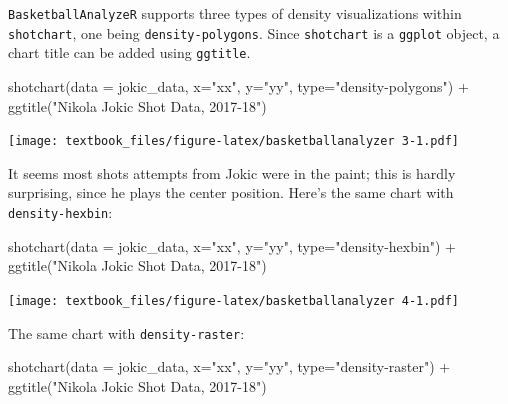 \documentclass[
  11pt,
]{book}
\newenvironment{Shaded}{\begin{snugshade}}{\end{snugshade}}
\newcommand{\AttributeTok}[1]{\textcolor[rgb]{0.77,0.63,0.00}{#1}}
\newcommand{\FunctionTok}[1]{\textcolor[rgb]{0.00,0.00,0.00}{#1}}
\newcommand{\NormalTok}[1]{#1}
\newcommand{\SpecialCharTok}[1]{\textcolor[rgb]{0.00,0.00,0.00}{#1}}
\newcommand{\StringTok}[1]{\textcolor[rgb]{0.31,0.60,0.02}{#1}}
\theoremstyle{definition}
\theoremstyle{definition}
\theoremstyle{definition}
\theoremstyle{definition}
\theoremstyle{remark}
\begin{document}
\texttt{BasketballAnalyzeR} supports three types of density visualizations within \texttt{shotchart}, one being \texttt{density-polygons}. Since \texttt{shotchart} is a \texttt{ggplot} object, a chart title can be added using \texttt{ggtitle}.

\begin{Shaded}
\begin{Highlighting}[]
\FunctionTok{shotchart}\NormalTok{(}\AttributeTok{data =}\NormalTok{ jokic\_data, }\AttributeTok{x=}\StringTok{"xx"}\NormalTok{, }\AttributeTok{y=}\StringTok{"yy"}\NormalTok{, }\AttributeTok{type=}\StringTok{"density{-}polygons"}\NormalTok{) }\SpecialCharTok{+} 
  \FunctionTok{ggtitle}\NormalTok{(}\StringTok{"Nikola Jokic Shot Data, 2017{-}18"}\NormalTok{)}
\end{Highlighting}
\end{Shaded}

\texttt{[image: textbook\_files/figure-latex/basketballanalyzer 3-1.pdf]}

It seems most shots attempts from Jokic were in the paint; this is hardly surprising, since he plays the center position. Here's the same chart with \texttt{density-hexbin}:

\begin{Shaded}
\begin{Highlighting}[]
\FunctionTok{shotchart}\NormalTok{(}\AttributeTok{data =}\NormalTok{ jokic\_data, }\AttributeTok{x=}\StringTok{"xx"}\NormalTok{, }\AttributeTok{y=}\StringTok{"yy"}\NormalTok{, }\AttributeTok{type=}\StringTok{"density{-}hexbin"}\NormalTok{) }\SpecialCharTok{+} 
  \FunctionTok{ggtitle}\NormalTok{(}\StringTok{"Nikola Jokic Shot Data, 2017{-}18"}\NormalTok{)}
\end{Highlighting}
\end{Shaded}

\texttt{[image: textbook\_files/figure-latex/basketballanalyzer 4-1.pdf]}

The same chart with \texttt{density-raster}:

\begin{Shaded}
\begin{Highlighting}[]
\FunctionTok{shotchart}\NormalTok{(}\AttributeTok{data =}\NormalTok{ jokic\_data, }\AttributeTok{x=}\StringTok{"xx"}\NormalTok{, }\AttributeTok{y=}\StringTok{"yy"}\NormalTok{, }\AttributeTok{type=}\StringTok{"density{-}raster"}\NormalTok{) }\SpecialCharTok{+} 
  \FunctionTok{ggtitle}\NormalTok{(}\StringTok{"Nikola Jokic Shot Data, 2017{-}18"}\NormalTok{)}
\end{Highlighting}
\end{Shaded}
\end{document}
